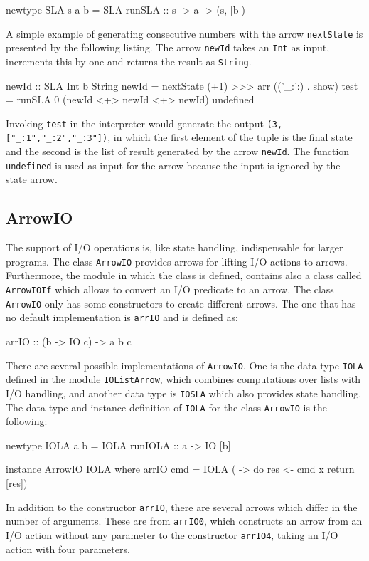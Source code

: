 \documentclass[11pt,a4paper,headsepline, bibtotoc]{scrreprt}
\begin{document}
\begin{code}
newtype SLA s a b = SLA { runSLA :: s -> a -> (s, [b]) }
\end{code}
A simple example of generating consecutive numbers with the arrow \texttt{nextState} is presented by the following listing. The arrow \texttt{newId} takes an \texttt{Int} as input, increments this by one and returns the result as \texttt{String}.
\begin{code}
newId :: SLA Int b String
newId = nextState (+1)
        >>>
        arr (('_:':) . show)
test = runSLA 0 (newId <+> newId <+> newId) undefined
\end{code}
Invoking \texttt{test} in the interpreter would generate the output \texttt{(3,["\_:1","\_:2","\_:3"])}, in which the first element of the tuple is the final state and the second is the list of result generated by the arrow \texttt{newId}. The function \texttt{undefined} is used as input for the arrow because the input is ignored by the state arrow.

\subsection{ArrowIO}
The support of I/O operations is, like state handling, indispensable for larger programs. The class \texttt{ArrowIO} provides arrows for lifting I/O actions to arrows. Furthermore, the module in which the class is defined, contains also a class called \texttt{ArrowIOIf} which allows to convert an I/O predicate to an arrow. The class \texttt{ArrowIO} only has some constructors to create different arrows. The one that has no default implementation is \texttt{arrIO} and is defined as:
\begin{code}
arrIO :: (b -> IO c) -> a b c
\end{code}
There are several possible implementations of \texttt{ArrowIO}. One is the data type \texttt{IOLA} defined in the module \texttt{IOListArrow}, which combines computations over lists with I/O handling, and another data type is \texttt{IOSLA} which also provides state handling. The data type and instance definition of \texttt{IOLA} for the class \texttt{ArrowIO} is the following:
\begin{code}
newtype IOLA a b = IOLA { runIOLA :: a -> IO [b] }

instance ArrowIO IOLA where
    arrIO cmd = IOLA ( \x -> do
                        res <- cmd x
                        return [res])
\end{code}
In addition to the constructor \texttt{arrIO}, there are several arrows which differ in the number of arguments. These are from \texttt{arrIO0}, which constructs an arrow from an I/O action without any parameter to the constructor \texttt{arrIO4}, taking an I/O action with four parameters.
\end{document}
